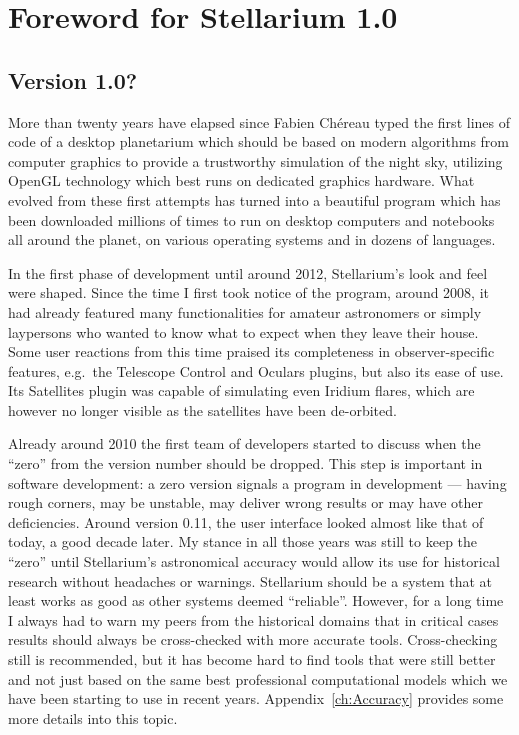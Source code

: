 
\chapter*{Foreword for Stellarium 1.0}
\label{ch:Foreword}

\section*{Version 1.0?}

More than twenty years have elapsed since Fabien Ch\'ereau typed the
first lines of code of a desktop planetarium which should be based on
modern algorithms from computer graphics to provide a trustworthy
simulation of the night sky, utilizing OpenGL technology which best
runs on dedicated graphics hardware. What evolved from these first
attempts has turned into a beautiful program which has been
downloaded millions of times to run on desktop computers and notebooks
all around the planet, on various operating systems and in dozens of
languages.

In the first phase of development until around 2012, Stellarium's look
and feel were shaped. Since the time I first took notice of the
program, around 2008, it had already featured many functionalities for
amateur astronomers or simply laypersons who wanted to know what to
expect when they leave their house. Some user reactions from this time
praised its completeness in observer-specific features, e.g.\ the
Telescope Control and Oculars plugins, but also its ease of use. Its
Satellites plugin was capable of simulating even Iridium flares, which
are however no longer visible as the satellites have been de-orbited. 

Already around 2010 the first team of developers started to discuss
when the ``zero'' from the version number should be dropped. This step
is important in software development: a zero version signals a
program in development --- having rough corners, may be unstable, may
deliver wrong results or may have other deficiencies. Around version 0.11,
the user interface looked almost like that of today, a good decade later.
My stance in all those years was still 
to keep the ``zero'' until Stellarium's astronomical accuracy would
allow its use for historical research without headaches or
warnings. Stellarium should be a system that at least works as good as
other systems deemed ``reliable''. However, for a long time I always
had to warn my peers from the historical domains that in critical cases results should always 
be cross-checked with more accurate tools. Cross-checking still is
recommended, but it has become hard to find tools that were still better and
not just based on the same best professional computational models which we have
been starting to use in recent years. Appendix~\ref{ch:Accuracy}
provides some more details into this topic.

